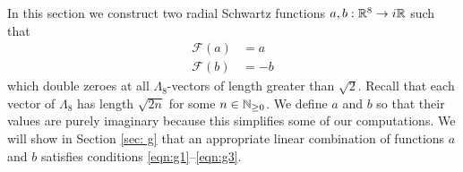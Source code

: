 
In this section we construct two radial Schwartz functions $a,b:\mathbb{R}^8\to i\mathbb{R}$ such that
\begin{align}\mathcal{F}(a)&=a\label{eqn: a fourier}\\
  \mathcal{F}(b)&=-b\label{eqn: b fourier}
\end{align}
which double zeroes at all $\Lambda_8$-vectors of length greater than $\sqrt{2}$. Recall that each vector of $\Lambda_8$ has length $\sqrt{2n}$ for some $n\in\mathbb{N}_{\geq 0}$. We define $a$ and $b$ so that their values are purely imaginary because this simplifies some of our computations. We will show in Section \ref{sec: g} that an appropriate linear combination of functions $a$ and $b$ satisfies conditions \eqref{eqn:g1}--\eqref{eqn:g3}.

